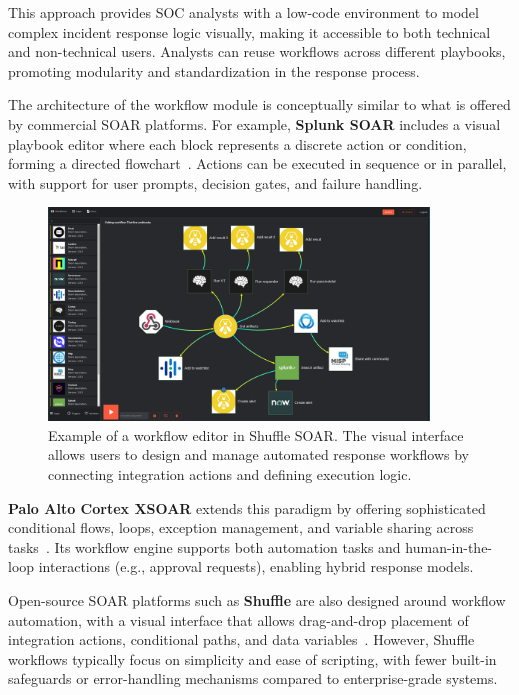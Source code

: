 This approach provides SOC analysts with a low-code environment to model complex incident response logic visually, making it accessible to both technical and non-technical users. Analysts can reuse workflows across different playbooks, promoting modularity and standardization in the response process.

The architecture of the workflow module is conceptually similar to what is offered by commercial SOAR platforms. For example, \textbf{Splunk SOAR} includes a visual playbook editor where each block represents a discrete action or condition, forming a directed flowchart~\cite{splunk}. Actions can be executed in sequence or in parallel, with support for user prompts, decision gates, and failure handling.

\begin{figure}[ht]
    \centering
    \includegraphics[width=0.9\textwidth]{images/shuffle_soar_workflow.png}
        \caption[Example of a workflow editor in Shuffle SOAR]{Example of a workflow editor in Shuffle SOAR. The visual interface allows users to design and manage automated response workflows by connecting integration actions and defining execution logic.}
    \label{fig:shuffle-soar-workflow}
\end{figure}

\textbf{Palo Alto Cortex XSOAR} extends this paradigm by offering sophisticated conditional flows, loops, exception management, and variable sharing across tasks~\cite{paloalto}. Its workflow engine supports both automation tasks and human-in-the-loop interactions (e.g., approval requests), enabling hybrid response models.

Open-source SOAR platforms such as \textbf{Shuffle} are also designed around workflow automation, with a visual interface that allows drag-and-drop placement of integration actions, conditional paths, and data variables~\cite{techtarget}. However, Shuffle workflows typically focus on simplicity and ease of scripting, with fewer built-in safeguards or error-handling mechanisms compared to enterprise-grade systems.

